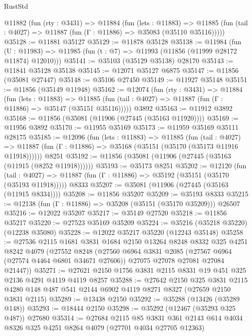 \begin{lexlean}{RustStd}
\begin{coremodule}
  @11882
    (fun (rty : @3431) =>
    @11884
      (fun (lets : @11883) =>
      @11885 (fun (tail : @4027) => @11887 (fun (Γ : @11886) => @35083 (@35110 @35116)))))
@35128 := @11881 @35127
@35129 := @11878 @35128
@35138 := @11984
    (fun (U : @11983) => @11985 (fun (t : @7) => @11993 (@11856 (@11999 @28172 @11874) @12010)))
@35141 := @35103 (@35129 @35138) @28170
@35143 := @11841 @35128 @35138
@35145 := @12071 @35127 @6875
@35147 := @11856 (@35081 @27447)
@35148 := @35106 @27450
@35149 := @11927 @35148
@35151 := @11856 (@35149 @11948)
@35162 := @12074
    (fun (rty : @3431) =>
    @11884
      (fun (lets : @11883) =>
      @11885 (fun (tail : @4027) => @11887 (fun (Γ : @11886) => @35147 (@35151 @35116)))))
    @3892
@35163 := @11912 @3892
@35168 := @11856 (@35081 (@11906 (@27445 (@35163 @11920))))
@35169 := @11956 @3892
@35170 := @11955 @35169
@35173 := @11959 @35169 @35111 @28175
@35185 := @12096
    (fun (lets : @11883) =>
    @11885
      (fun (tail : @4027) =>
      @11887 (fun (Γ : @11886) => @35168 (@35151 (@35170 (@35173 @11916 @11918))))))
    @8251
@35192 := @11856 (@35081 (@11906 (@27445 (@35163 (@11915 (@8252 @11918))))))
@35193 := @35173 @8251
@35202 := @12120
    (fun (tail : @4027) => @11887 (fun (Γ : @11886) => @35192 (@35151 (@35170 (@35193 @11918)))))
    @8333
@35207 := @35081 (@11906 (@27445 (@35163 (@11915 @8334))))
@35208 := @11856 @35207
@35209 := @35193 @8333
@35215 := @12138 (fun (Γ : @11886) => @35208 (@35151 (@35170 @35209))) @26507
@35216 := @12022 @35207
@35217 := @35149 @27520
@35218 := @11856 @35217
@35220 := @27523 @35169 @35209
@35224 := @35216 (@35218 @35220) (@12238 @35080)
@35228 := @12022 @35217 @35220 (@12243 @35148)
@35258 := @27536
    @2115
    @1681
    @3831
    @1684
    @2150
    @13264
    @8248
    @8332
    @325
    @4251
    @8242
    @4079
    (@27552
      @8248
      (@27560
        @6964
        @3831
        @2085
        (@27567 @6964 (@27574 @4464 @6801 @34671 @27606))
        @27075
        @27078
        @27081
        @27084
        @21447))
@35271 := @27621 @2150 @1756 @3831 @2115 @8331 @19 @451 @325 @2136 @4291 @4119 @4119 @8257
@35288 := @27642
    @2150
    @325
    @3831
    @2115
    @4280
    @148
    @487
    @541
    @2144
    @6902
    @4119
    @8271
    @8327
    (@27659 @2150 @3831 @2115)
@35289 := @13438 @2150
@35292 := @35288 (@13426 (@35289 @148))
@35293 := @18444 @2150
@35298 := @35292 (@12467 (@35293 @325 @487)) @27680
@35314 := @27684
    @2115
    @85
    @3831
    @361
    @2143
    @614
    @4034
    @8326
    @325
    @4251
    @8264
    @4079
    (@27701 @4034 @27705 @12363)

\end{coremodule}
\end{lexlean}

